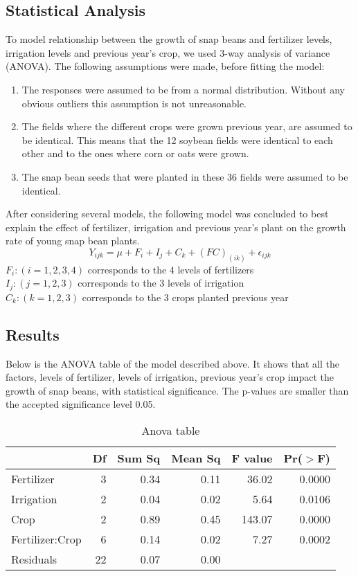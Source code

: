 \documentclass[11pt,a4paper]{article}
\begin{document}
\subsection*{Statistical Analysis}
To model relationship between the growth of snap beans and fertilizer levels, irrigation levels and previous year's crop, we used 3-way analysis of variance (ANOVA). The following assumptions were made, before fitting the model:
\begin{enumerate}
\item The responses were assumed to be from a normal distribution. Without any obvious outliers this assumption is not unreasonable.
\item The fields where the different crops were grown previous year, are assumed to be identical. This means that the 12 soybean fields were identical to each other and to the ones where corn or oats were grown.
\item The snap bean seeds that were planted in these 36 fields were assumed to be identical. 
\end{enumerate}
After considering several models, the following model was concluded to best explain the effect of fertilizer, irrigation and previous year's plant on the growth rate of young snap bean plants. 
\[ Y_{ijk} = \mu + F_i + I_j + C_k + (FC)_{(ik)} + \epsilon_{ijk} \]
$F_i: (i = 1, 2, 3, 4)$ corresponds to the 4 levels of fertilizers \\
$I_j: (j = 1, 2, 3)$ corresponds to the 3 levels of irrigation \\
$C_k: (k = 1, 2, 3)$ corresponds to the 3 crops planted previous year

\subsection*{Results}
Below is the ANOVA table of the model described above. It shows that all the factors, levels of fertilizer, levels of irrigation, previous year's crop impact the growth of snap beans, with statistical significance. The p-values are smaller than the accepted significance level 0.05. 
\begin{table}[H]
\centering
\begin{tabular}{lrrrrr}
  \hline
 & Df & Sum Sq & Mean Sq & F value & Pr($>$F) \\ 
  \hline
  Fertilizer & 3 & 0.34 & 0.11 & 36.02 & 0.0000 \\ 
  Irrigation & 2 & 0.04 & 0.02 & 5.64 & 0.0106 \\ 
  Crop & 2 & 0.89 & 0.45 & 143.07 & 0.0000 \\ 
  Fertilizer:Crop & 6 & 0.14 & 0.02 & 7.27 & 0.0002 \\ 
  Residuals & 22 & 0.07 & 0.00 &  &  \\ 
   \hline
\end{tabular}
\caption{Anova table}
\end{table}
\end{document}
